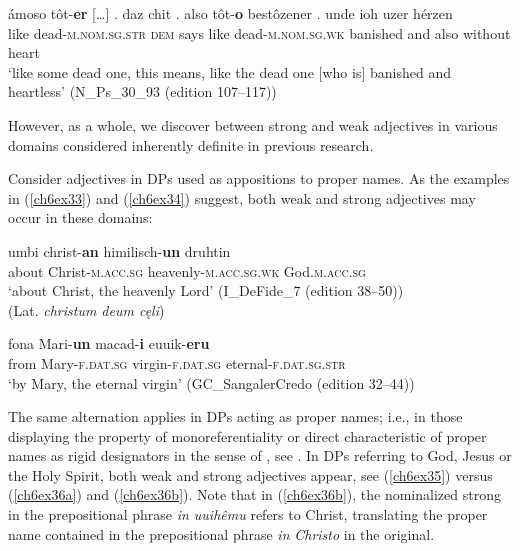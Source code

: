 \documentclass[output=paper,colorlinks,citecolor=brown]{langscibook}
\begin{document}
\begin{exe}
\ex\label{ch6ex32}
\gll ámoso tôt-\textbf{er} {[}\ldots{]} . daz chit . also tôt-\textbf{o} bestôzener . unde ioh uzer hérzen\\
like dead-\textsc{m.nom.sg.str} {} {} \textsc{dem} says {} like dead-\textsc{m.nom.sg.wk} banished {} and also without heart\\
\glt `like some dead one, this means, like the dead one {[}who is{]} banished and heartless' (N\_Ps\_30\_93 (edition 107--117))
\end{exe}

However, as a whole, we discover  between strong and weak adjectives
in various domains considered inherently definite in previous
research.

Consider adjectives in DPs used as appositions to proper names. As the
examples in (\ref{ch6ex33}) and (\ref{ch6ex34}) suggest, both weak and strong adjectives may
occur in these domains:

\begin{exe}
\ex\label{ch6ex33}
\gll umbi christ-\textbf{an} himilisch-\textbf{un} druhtin\\
about Christ-\textsc{m.acc.sg} heavenly-\textsc{m.acc.sg.wk} God.\textsc{m.acc.sg}\\
\glt `about Christ, the heavenly Lord' (I\_DeFide\_7 (edition 38--50)) \\ 
 (Lat. \emph{christum deum cęli})
\end{exe}

\begin{exe}
\ex\label{ch6ex34}
\gll fona Mari-\textbf{un} macad-\textbf{i} euuik-\textbf{eru}\\
from Mary-\textsc{f.dat.sg} virgin-\textsc{f.dat.sg} eternal-\textsc{f.dat.sg.str}\\
\glt `by Mary, the eternal virgin' (GC\_SangalerCredo (edition 32--44))
\end{exe}

The same alternation applies in DPs acting as proper names; i.e., in
those displaying the property of monoreferentiality or direct
 characteristic of proper names as rigid designators in
the sense of \citet{Kripke80}, see \citet[29]{Nublingetal15}. In DPs
referring to God, Jesus or the Holy Spirit, both weak and strong
adjectives appear, see (\ref{ch6ex35}) versus (\ref{ch6ex36a}) and (\ref{ch6ex36b}). Note that in (\ref{ch6ex36b}), the
nominalized strong  in the prepositional phrase \emph{in uuihêmu} refers to
Christ, translating the proper name contained in the prepositional phrase \emph{in}
\emph{Christo} in the  original.
\end{document}
